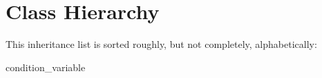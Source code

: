 \section{Class Hierarchy}
This inheritance list is sorted roughly, but not completely, alphabetically\+:\begin{DoxyCompactList}
\item condition\+\_\+variable\begin{DoxyCompactList}
\item {}
\end{DoxyCompactList}
\item {}
\item {}
\item {}
\item {}
\item {}
\end{DoxyCompactList}
